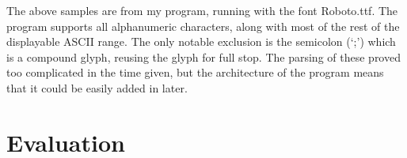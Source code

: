\documentclass{report}
\begin{document}
The above samples are from my program, running with the font Roboto.ttf. The
program supports all alphanumeric characters, along with most of the rest of the
displayable ASCII range. The only notable exclusion is the semicolon (`;') which
is a compound glyph, reusing the glyph for full stop. The parsing of these
proved too complicated in the time given, but the architecture of the program
means that it could be easily added in later.

\subsection{}  

\chapter{Evaluation}
\end{document}
